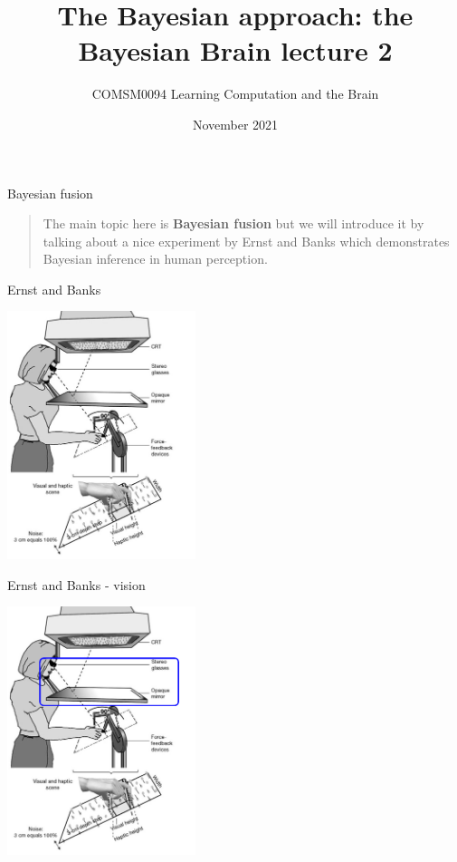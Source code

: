 \documentclass{beamer}
\title[The Bayesian Brain lecture 2]{The Bayesian approach: the Bayesian Brain lecture 2}
\author{COMSM0094 Learning Computation and the Brain}
\institute{\texttt{comsm0094.github.io}}
\date{November 2021}
\begin{document}
\maketitle



\begin{frame}{Bayesian fusion}
  \begin{quote}
    The main topic here is \textbf{Bayesian fusion} but we will introduce it by talking about a nice experiment by Ernst and Banks which demonstrates Bayesian inference in human perception.
  \end{quote}
  \vfill
\end{frame}

\begin{frame}{Ernst and Banks}
\begin{center}
\includegraphics[width=5.5cm]{fig_ernstbanks.png}
\end{center}
  \vfill
\end{frame}


\begin{frame}{Ernst and Banks - vision}
\begin{center}
\includegraphics[width=5.5cm]{fig_ernstbanks_vision.png}
\end{center}
  \vfill
\end{frame}
\end{document}
